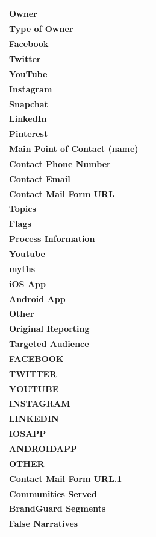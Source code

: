 \begin{table}[H]
\begin{tabularx}{\textwidth}{|X|c|}
\hline
\textbf{Owner} & \\
\hline
\textbf{Type of Owner} & \\
\hline
\textbf{Facebook} & \\
\hline
\textbf{Twitter} & \\
\hline
\textbf{YouTube} & \\
\hline
\textbf{Instagram} & \\
\hline
\textbf{Snapchat} & \\
\hline
\textbf{LinkedIn} & \\
\hline
\textbf{Pinterest} & \\
\hline
\textbf{Main Point of Contact (name)} & \\
\hline
\textbf{Contact Phone Number} & \\
\hline
\textbf{Contact Email} & \\
\hline
\textbf{Contact Mail Form URL} & \\
\hline
\textbf{Topics} & \\
\hline
\textbf{Flags} & \\
\hline
\textbf{Process Information} & \\
\hline
\textbf{Youtube} & \\
\hline
\textbf{myths} & \\
\hline
\textbf{iOS App} & \\
\hline
\textbf{Android App} & \\
\hline
\textbf{Other} & \\
\hline
\textbf{Original Reporting} & \\
\hline
\textbf{Targeted Audience} & \\
\hline
\textbf{FACEBOOK} & \\
\hline
\textbf{TWITTER} & \\
\hline
\textbf{YOUTUBE} & \\
\hline
\textbf{INSTAGRAM} & \\
\hline
\textbf{LINKEDIN} & \\
\hline
\textbf{IOSAPP} & \\
\hline
\textbf{ANDROIDAPP} & \\
\hline
\textbf{OTHER} & \\
\hline
\textbf{Contact Mail Form URL.1} & \\
\hline
\textbf{Communities Served} & \\
\hline
\textbf{BrandGuard Segments} & \\
\hline
\textbf{False Narratives} & \\
\bottomrule
\end{tabularx}
\end{table}